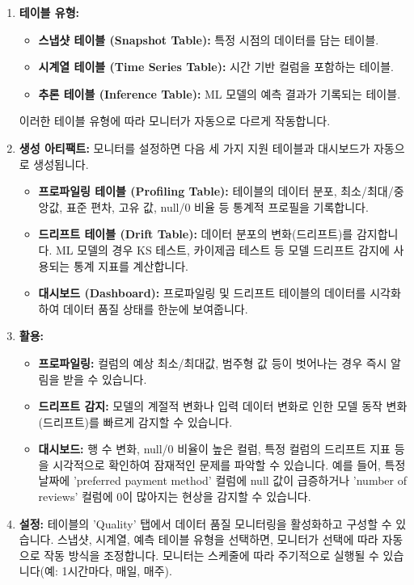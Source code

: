 \documentclass[11pt,a4paper]{article}
\begin{document}
\begin{enumerate}
    \item \textbf{테이블 유형:}
    \begin{itemize}
        \item \textbf{스냅샷 테이블 (Snapshot Table):} 특정 시점의 데이터를 담는 테이블.
        \item \textbf{시계열 테이블 (Time Series Table):} 시간 기반 컬럼을 포함하는 테이블.
        \item \textbf{추론 테이블 (Inference Table):} ML 모델의 예측 결과가 기록되는 테이블.
    \end{itemize}
    이러한 테이블 유형에 따라 모니터가 자동으로 다르게 작동합니다.

    \item \textbf{생성 아티팩트:}
    모니터를 설정하면 다음 세 가지 지원 테이블과 대시보드가 자동으로 생성됩니다.
    \begin{itemize}
        \item \textbf{프로파일링 테이블 (Profiling Table):} 테이블의 데이터 분포, 최소/최대/중앙값, 표준 편차, 고유 값, null/0 비율 등 통계적 프로필을 기록합니다.
        \item \textbf{드리프트 테이블 (Drift Table):} 데이터 분포의 변화(드리프트)를 감지합니다. ML 모델의 경우 KS 테스트, 카이제곱 테스트 등 모델 드리프트 감지에 사용되는 통계 지표를 계산합니다.
        \item \textbf{대시보드 (Dashboard):} 프로파일링 및 드리프트 테이블의 데이터를 시각화하여 데이터 품질 상태를 한눈에 보여줍니다.
    \end{itemize}

    \item \textbf{활용:}
    \begin{itemize}
        \item \textbf{프로파일링:} 컬럼의 예상 최소/최대값, 범주형 값 등이 벗어나는 경우 즉시 알림을 받을 수 있습니다.
        \item \textbf{드리프트 감지:} 모델의 계절적 변화나 입력 데이터 변화로 인한 모델 동작 변화(드리프트)를 빠르게 감지할 수 있습니다.
        \item \textbf{대시보드:} 행 수 변화, null/0 비율이 높은 컬럼, 특정 컬럼의 드리프트 지표 등을 시각적으로 확인하여 잠재적인 문제를 파악할 수 있습니다. 예를 들어, 특정 날짜에 'preferred payment method' 컬럼에 null 값이 급증하거나 'number of reviews' 컬럼에 0이 많아지는 현상을 감지할 수 있습니다.
    \end{itemize}

    \item \textbf{설정:}
    테이블의 'Quality' 탭에서 데이터 품질 모니터링을 활성화하고 구성할 수 있습니다. 스냅샷, 시계열, 예측 테이블 유형을 선택하면, 모니터가 선택에 따라 자동으로 작동 방식을 조정합니다. 모니터는 스케줄에 따라 주기적으로 실행될 수 있습니다(예: 1시간마다, 매일, 매주).
\end{enumerate}
\end{document}
